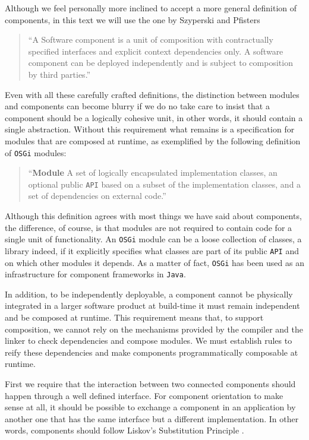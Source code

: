 Although we feel personally more inclined to accept a more general definition of components, in this text we will use the one by Szyperski and Pfisters \cite{WCOP97}

\begin{quotation}
``A Software component is a unit of composition with contractually specified interfaces and explicit context dependencies only.
A software component can be deployed independently and is subject to composition by third parties.''
\end{quotation}

Even with all these carefully crafted definitions, the distinction between modules and components can become blurry if
we do no take care to insist that a component should be a logically cohesive unit, in other words, it should contain
a single abstraction. Without this requirement what remains is a specification for modules that are composed at runtime,
as exemplified by the following definition of \texttt{OSGi} modules: \cite{Hall}

\begin{quotation}
``\textbf{Module} A set of logically encapsulated implementation classes, an optional public \texttt{API} based on a subset
of the implementation classes, and a set of dependencies on external code.''
\end{quotation}

Although this definition agrees with most things we have said about components, the difference, of course, is that modules
are not required to contain code for a single unit of functionality. An \texttt{OSGi} module can be a loose collection of
classes, a library indeed, if it explicitly specifies what classes are part of its public \texttt{API} and on which other
modules it depends. As a matter of fact, \texttt{OSGi} has been used as an infrastructure for component frameworks in \texttt{Java}.

In addition, to be independently deployable, a component cannot be physically integrated in a larger software product at build-time
it must remain independent and be composed at runtime. This requirement means that, to support composition, we cannot rely on the
mechanisms provided by the compiler and the linker to check dependencies and compose modules. We must establish rules to reify these
dependencies and make components programmatically composable at runtime. 

First we require that the interaction between two connected components should happen through a well defined interface.
For component orientation to make sense at all, it should be possible to exchange a component in an application by another
one that has the same interface but a different implementation. In other words, components should follow Liskov's
Substitution Principle \cite{Liskov}.

